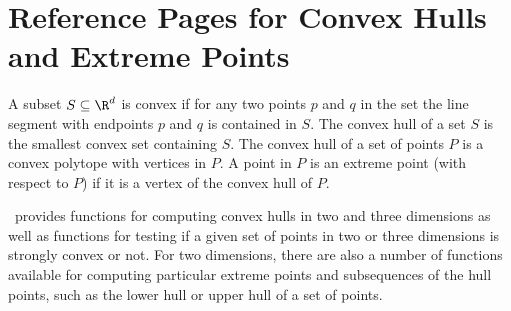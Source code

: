 
\clearpage
\section{Reference Pages for Convex Hulls and Extreme Points}

A subset $S \subseteq \R^d$ is convex if for any two points $p$ and $q$
in the set the line segment with endpoints $p$ and $q$ is contained
in $S$. The convex hull of a set $S$ is 
the smallest convex set containing
$S$. The convex hull of a set of points $P$ is a convex 
polytope with vertices in $P$.  A point in $P$ is an extreme point 
(with respect to $P$) if it is a vertex 
of the convex hull of $P$.

\cgal\ provides functions for computing convex hulls in two and three 
dimensions as well as functions for testing if a given set of points
in two or three dimensions is strongly convex or not.  For two dimensions,
there are also a number of functions available for computing particular
extreme points and subsequences of the hull points, such as the lower
hull or upper hull of a set of points.


\\
\\
 \\


  \\
  \\
  \\
  \\
  \\
  \\
 \\
 \\

